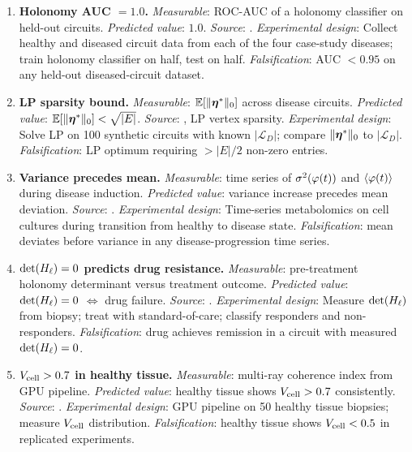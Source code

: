 \begin{enumerate}[label=\textbf{M\arabic*.}, leftmargin=3em]

\item \textbf{Holonomy AUC $= 1.0$.}
  \emph{Measurable}: ROC-AUC of a holonomy classifier on held-out circuits.
  \emph{Predicted value}: $1.0$.
  \emph{Source}: .
  \emph{Experimental design}: Collect healthy and diseased circuit data from
    each of the four case-study diseases; train holonomy classifier on half,
    test on half.
  \emph{Falsification}: AUC $< 0.95$ on any held-out diseased-circuit dataset.

\item \textbf{LP sparsity bound.}
  \emph{Measurable}: $\mathbb{E}[\|\boldsymbol{\eta}^*\|_0]$ across disease circuits.
  \emph{Predicted value}: $\mathbb{E}[\|\boldsymbol{\eta}^*\|_0] < \sqrt{|E|}$.
  \emph{Source}: , LP vertex sparsity.
  \emph{Experimental design}: Solve LP on 100 synthetic circuits with known
    $|\mathcal{L}_D|$; compare $\|\boldsymbol{\eta}^*\|_0$ to $|\mathcal{L}_D|$.
  \emph{Falsification}: LP optimum requiring $> |E|/2$ non-zero entries.

\item \textbf{Variance precedes mean.}
  \emph{Measurable}: time series of $\sigma^2(\varphi(t))$ and
    $\langle\varphi(t)\rangle$ during disease induction.
  \emph{Predicted value}: variance increase precedes mean deviation.
  \emph{Source}: .
  \emph{Experimental design}: Time-series metabolomics on cell cultures
    during transition from healthy to disease state.
  \emph{Falsification}: mean deviates before variance in any disease-progression
    time series.

\item \textbf{$\det(H_\ell) = 0$ predicts drug resistance.}
  \emph{Measurable}: pre-treatment holonomy determinant versus treatment outcome.
  \emph{Predicted value}: $\det(H_\ell) = 0$ $\Leftrightarrow$ drug failure.
  \emph{Source}: .
  \emph{Experimental design}: Measure $\det(H_\ell)$ from biopsy; treat with
    standard-of-care; classify responders and non-responders.
  \emph{Falsification}: drug achieves remission in a circuit with measured
    $\det(H_\ell) = 0$.

\item \textbf{$V_{\mathrm{cell}} > 0.7$ in healthy tissue.}
  \emph{Measurable}: multi-ray coherence index from GPU pipeline.
  \emph{Predicted value}: healthy tissue shows $V_{\mathrm{cell}} > 0.7$ consistently.
  \emph{Source}: .
  \emph{Experimental design}: GPU pipeline on 50 healthy tissue biopsies;
    measure $V_{\mathrm{cell}}$ distribution.
  \emph{Falsification}: healthy tissue shows $V_{\mathrm{cell}} < 0.5$ in replicated
    experiments.


\end{enumerate}
